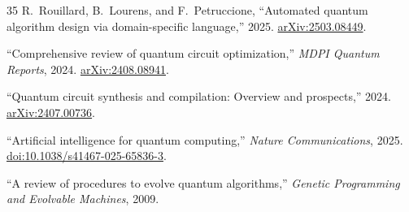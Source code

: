 \documentclass[11pt]{article}
\begin{document}
\begin{thebibliography}{35}
R.~Rouillard, B.~Lourens, and F.~Petruccione,
``Automated quantum algorithm design via domain-specific language,''
2025.
\newblock \href{https://arxiv.org/abs/2503.08449}{arXiv:2503.08449}.

``Comprehensive review of quantum circuit optimization,''
\emph{MDPI Quantum Reports}, 2024.
\newblock \href{https://arxiv.org/abs/2408.08941}{arXiv:2408.08941}.

``Quantum circuit synthesis and compilation: Overview and prospects,''
2024.
\newblock \href{https://arxiv.org/abs/2407.00736}{arXiv:2407.00736}.

``Artificial intelligence for quantum computing,''
\emph{Nature Communications}, 2025.
\newblock \href{https://www.nature.com/articles/s41467-025-65836-3}{doi:10.1038/s41467-025-65836-3}.

``A review of procedures to evolve quantum algorithms,''
\emph{Genetic Programming and Evolvable Machines}, 2009.

\end{thebibliography}
\end{document}
